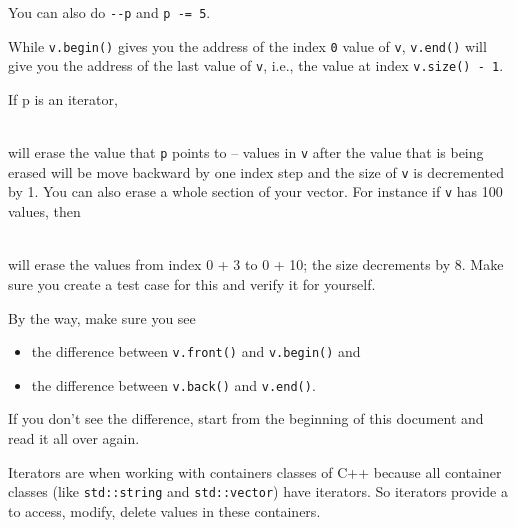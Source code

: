 You can also do \verb!--p! and \verb!p -= 5!.

While \verb!v.begin()! gives you the address of the index \verb!0! value of \verb!v!, \verb!v.end()! will give you the address of the last value of \verb!v!, i.e., the value at index \verb!v.size() - 1!.

If p is an iterator,

\\

will erase the value that \texttt{p} points to -- values in \texttt{v} after
the value that is being erased will be move backward by one index step
and the size of \texttt{v} is decremented by 1. You can also erase a whole
section of your vector. For instance if \texttt{v} has 100 values, then

\\

will erase the values from index 0 + 3 to 0 + 10; the size decrements by
8. Make sure you create a test case for this and verify it for yourself.

By the way, make sure you see

\begin{itemize}
\item
  the difference between \texttt{v.front()} and \texttt{v.begin()} and
\item
  the difference between \texttt{v.back()} and \texttt{v.end()}.
\end{itemize}

If you don't see the difference, start from the beginning of this
document and read it all over again.

Iterators are  when working with containers classes of C++ because all container classes (like \verb!std::string! and \verb!std::vector!) have iterators. So iterators provide a  to access, modify, delete values in these containers.

